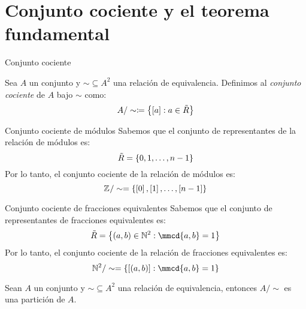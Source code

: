 \section{Conjunto cociente y el teorema fundamental}
\begin{frame}{Conjunto cociente}
	\begin{mdefinition}
		Sea $ A $ un conjunto y $ \sim\subseteq A^{2} $ una relación de equivalencia. Definimos al \emph{conjunto cociente} de $ A $ bajo $ \sim $ como:
		\[ A/\sim\coloneqq\left\{ \left[ a \right]: a\in\tilde{R} \right\} \]
	\end{mdefinition}
\end{frame}
\begin{frame}{Conjunto cociente de módulos}
	Sabemos que el conjunto de representantes de la relación de módulos es:
	\[ \tilde{R} =\left\{ 0, 1,\dotsc, n - 1 \right\} \]
	Por lo tanto, el conjunto cociente de la relación de módulos es:
	\[ \mathbb{Z}^{} / \sim =\left\{ \left[ 0 \right],\left[ 1 \right],\dotsc,\left[ n - 1 \right] \right\} \]
\end{frame}
\begin{frame}{Conjunto cociente de fracciones equivalentes}
	Sabemos que el conjunto de representantes de fracciones equivalentes es:
	\[ \tilde{R} =\set{(a, b)\in\nmath[2]: \mmcd{a, b} = 1} \]
	Por lo tanto, el conjunto cociente de la relación de fracciones equivalentes es:
	\[ \nmath[2] / \sim =\set{\bracket{(a, b)}: \mmcd{a, b} = 1} \]
\end{frame}
\begin{frame}
	\begin{mtheorem}
		\label{thm: particion}
		Sean $A$ un conjunto y $\sim\subseteq A^{2}$ una relación de equivalencia, entonces $A / \sim$ es una partición de $A$.
	\end{mtheorem}
\end{frame}
